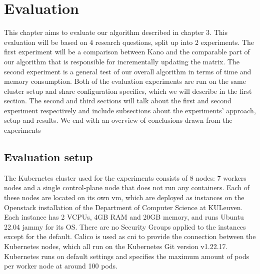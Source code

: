 \chapter{Evaluation}                                 \label{ch:evaluation}
This chapter aims to evaluate our algorithm described in chapter 3. This evaluation will be based on 4 research questions, split up into 2 experiments. The first experiment will be a comparison between Kano and the comparable part of our algorithm that is responsible for incrementally updating the matrix. The second experiment is a general test of our overall algorithm in terms of time and memory consumption. Both of the evaluation experiments are run on the same cluster setup and share configuration specifics, which we will describe in the first section. The second and third sections will talk about the first and second experiment respectively and include subsections about the experiments' approach, setup and results. We end with an overview of  conclusions drawn from the experiments
\\[10pt]

\section{Evaluation setup} \label{sec:evalsetup}


The Kubernetes cluster used for the experiments consists of 8 nodes: 7 workers nodes and a single control-plane node that does not run any containers. Each of these nodes are located on its own \acrshort{vm}, which are deployed as instances on the Openstack installation of the Department of Computer Science at KULeuven. Each instance has 2 VCPUs, 4GB RAM and 20GB memory, and runs Ubuntu 22.04 jammy for its OS. There are no Security Groups applied to the instances except for the default. Calico is used as \acrshort{cni} to provide the connection between the Kubernetes nodes, which all run on the Kubernetes Git version v1.22.17. Kubernetes runs on default settings and specifies the maximum amount of pods per worker node at around 100 pods.
\\[10pt]

